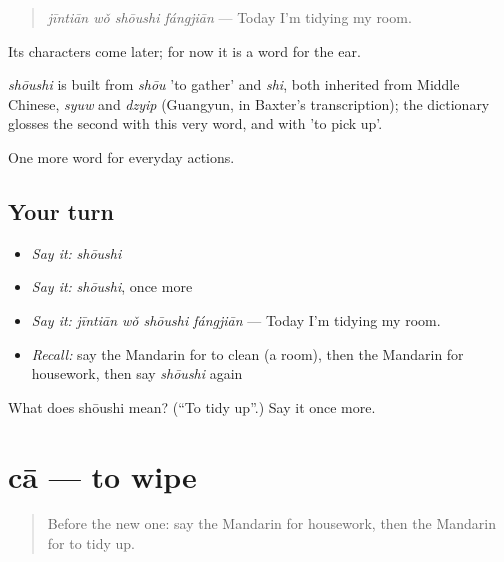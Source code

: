 \begin{quote}
\emph{jīntiān wǒ shōushi fángjiān} — Today I'm tidying my room.
\end{quote}

Its characters come later; for now it is a word for the ear.

\begin{cousinweb}
\emph{shōushi} is built from \emph{shōu} 'to gather' and \emph{shi}, both inherited from Middle Chinese, \emph{syuw} and \emph{dzyip} (Guangyun, in Baxter's transcription); the dictionary glosses the second with this very word, and with 'to pick up'.
\end{cousinweb}

\begin{grammarlens}[title={What you've built}]
One more word for everyday actions.
\end{grammarlens}

\subsection*{Your turn}
\begin{itemize}
\raggedright
  \item \emph{Say it:} \emph{shōushi}
  \item \emph{Say it:} \emph{shōushi}, once more
  \item \emph{Say it:} \emph{jīntiān wǒ shōushi fángjiān} — Today I'm tidying my room.
  \item \emph{Recall:} say the Mandarin for to clean (a room), then the Mandarin for housework, then say \emph{shōushi} again
\end{itemize}

\begin{tcolorbox}[breakable,colback=teal!4,colframe=teal!35!black,title={Before you move on}]
What does shōushi mean? (\textquotedblleft{}To tidy up\textquotedblright{}.) Say it once more.
\end{tcolorbox}
\section[cā]{cā — to wipe}

\label{lesson:ZH-C133-ca}



\begin{quote}
Before the new one: say the Mandarin for housework, then the Mandarin for to tidy up.
\end{quote}

